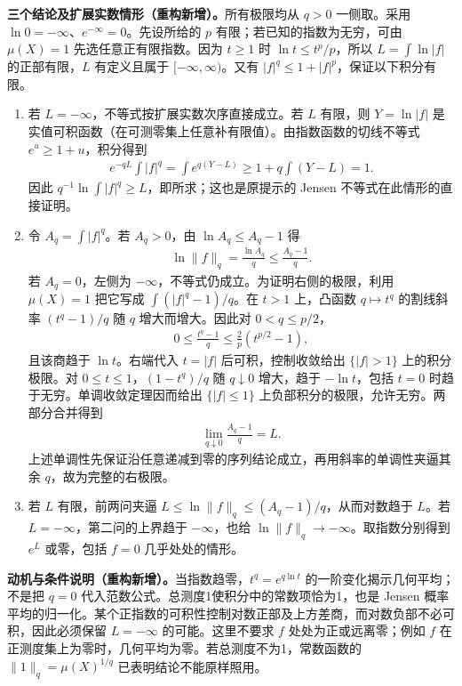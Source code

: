 \documentclass[../../main.tex]{subfiles}
\begin{document}
\begin{solution}
\textbf{三个结论及扩展实数情形（重构新增）。}所有极限均从 $q>0$ 一侧取。采用 $\ln0=-\infty$、$e^{-\infty}=0$。先设所给的 $p$ 有限；若已知的指数为无穷，可由 $\mu(X)=1$ 先选任意正有限指数。因为 $t\geqslant1$ 时 $\ln t\leqslant t^p/p$，所以 $L=\int\ln|f|$ 的正部有限，$L$ 有定义且属于 $[-\infty,\infty)$。又有 $|f|^q\leqslant1+|f|^p$，保证以下积分有限。
\begin{enumerate}
\item 若 $L=-\infty$，不等式按扩展实数次序直接成立。若 $L$ 有限，则 $Y=\ln|f|$ 是实值可积函数（在可测零集上任意补有限值）。由指数函数的切线不等式 $e^u\geqslant1+u$，积分得到
\begin{align*}
e^{-qL}\int|f|^q
=\int e^{q(Y-L)}\geqslant1+q\int(Y-L)=1.
\end{align*}
因此 $q^{-1}\ln\int|f|^q\geqslant L$，即所求；这也是原提示的 Jensen 不等式在此情形的直接证明。
\item 令 $A_q=\int|f|^q$。若 $A_q>0$，由 $\ln A_q\leqslant A_q-1$ 得
\begin{align*}
\ln\|f\|_q=\frac{\ln A_q}{q}\leqslant\frac{A_q-1}{q}.
\end{align*}
若 $A_q=0$，左侧为 $-\infty$，不等式仍成立。为证明右侧的极限，利用 $\mu(X)=1$ 把它写成 $\int (|f|^q-1)/q$。在 $t>1$ 上，凸函数 $q\mapsto t^q$ 的割线斜率 $(t^q-1)/q$ 随 $q$ 增大而增大。因此对 $0<q\leqslant p/2$，
\begin{align*}
0\leqslant\frac{t^q-1}{q}\leqslant\frac{2}{p}(t^{p/2}-1),
\end{align*}
且该商趋于 $\ln t$。右端代入 $t=|f|$ 后可积，控制收敛给出 $\{|f|>1\}$ 上的积分极限。对 $0\leqslant t\leqslant1$，$ (1-t^q)/q$ 随 $q\downarrow0$ 增大，趋于 $-\ln t$，包括 $t=0$ 时趋于无穷。单调收敛定理因而给出 $\{|f|\leqslant1\}$ 上负部积分的极限，允许无穷。两部分合并得到
\begin{align*}
\lim_{q\downarrow0}\frac{A_q-1}{q}=L.
\end{align*}
上述单调性先保证沿任意递减到零的序列结论成立，再用斜率的单调性夹逼其余 $q$，故为完整的右极限。
\item 若 $L$ 有限，前两问夹逼 $L\leqslant\ln\|f\|_q\leqslant(A_q-1)/q$，从而对数趋于 $L$。若 $L=-\infty$，第二问的上界趋于 $-\infty$，也给 $\ln\|f\|_q\to-\infty$。取指数分别得到 $e^L$ 或零，包括 $f=0$ 几乎处处的情形。
\end{enumerate}
\end{solution}
\begin{remark}
\textbf{动机与条件说明（重构新增）。}当指数趋零，$t^q=e^{q\ln t}$ 的一阶变化揭示几何平均；不是把 $q=0$ 代入范数公式。总测度1使积分中的常数项恰为1，也是 Jensen 概率平均的归一化。某个正指数的可积性控制对数正部及上方差商，而对数负部不必可积，因此必须保留 $L=-\infty$ 的可能。这里不要求 $f$ 处处为正或远离零；例如 $f$ 在正测度集上为零时，几何平均为零。若总测度不为1，常数函数的 $\|1\|_q=\mu(X)^{1/q}$ 已表明结论不能原样照用。
\end{remark}
\end{document}
